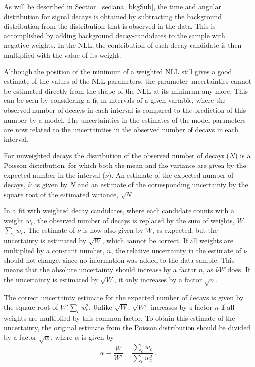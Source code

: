 As will be described in Section~\ref{sec:ana_bkgSub}, the time and angular distribution for \BstoJpsiKK{} signal decays is obtained by
subtracting the background distribution from the distribution that is observed in the data. This is accomplished by adding background
decay-candidates to the sample with negative weights. In the NLL, the contribution of each decay candidate is then multiplied with the
value of its weight.

Although the position of the minimum of a weighted NLL still gives a good estimate of the values of the NLL parameters, the parameter
uncertainties cannot be estimated directly from the shape of the NLL at its minimum any more. This can be seen by considering a fit in
intervals of a given variable, where the observed number of decays in each interval is compared to the prediction of this number by a
model. The uncertainties in the estimates of the model parameters are now related to the uncertainties in the observed number of decays in
each interval.

For unweighted decays the distribution of the observed number of decays ($N$) is a Poisson distribution, for which both the mean and the
variance are given by the expected number in the interval ($\nu$). An estimate of the expected number of decays, $\hat{\nu}$, is given by
$N$ and an estimate of the corresponding uncertainty by the square root of the estimated variance, $\sqrt{N}$.

In a fit with weighted decay candidates, where each candidate counts with a weight $w_c$, the observed number of decays is replaced by the
sum of weights, $W$\textequiv$\sum_c w_c$. The estimate of $\nu$ is now also given by $W$, as expected, but the uncertainty is estimated by
$\sqrt{W}$, which cannot be correct. If all weights are multiplied by a constant number, $n$, the relative uncertainty in the estimate of
$\nu$ should not change, since no information was added to the data sample. This means that the absolute uncertainty should increase by a
factor $n$, as $\hat{\nu}$\texteq$W$ does. If the uncertainty is estimated by $\sqrt{W}$, it only increases by a factor $\sqrt{n}$.

The correct uncertainty estimate for the expected number of decays is given by the square root of $W'$\textequiv$\sum_c w_c^2$. Unlike
$\sqrt{W}$, $\sqrt{W'}$ increases by a factor $n$ if all weights are multiplied by this common factor. To obtain this estimate of the
uncertainty, the original estimate from the Poisson distribution should be divided by a factor $\sqrt{\alpha}$, where $\alpha$ is given by
\begin{equation}
  \alpha \equiv \frac{W}{W'} = \frac{\sum_c w_c}{\sum_c w_c^2} \ .
\end{equation}

